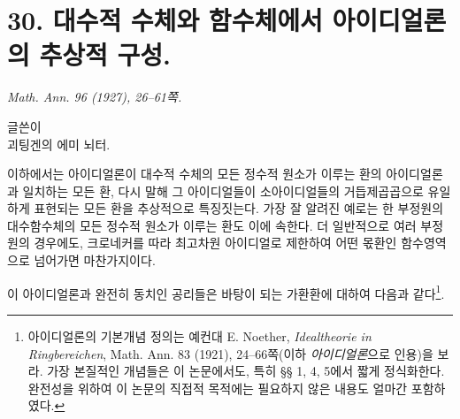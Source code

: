
\providecommand{\mC}{\mathfrak C}
\providecommand{\mE}{\mathfrak E}
\providecommand{\mF}{\mathfrak F}
\providecommand{\mG}{\mathfrak G}
\providecommand{\mH}{\mathfrak H}
\providecommand{\mM}{\mathfrak M}
\providecommand{\mN}{\mathfrak N}
\providecommand{\mO}{\mathfrak O}
\providecommand{\mX}{\mathfrak X}
\providecommand{\mc}{\mathfrak c}
\providecommand{\md}{\mathfrak d}
\providecommand{\me}{\mathfrak e}
\providecommand{\mf}{\mathfrak f}
\providecommand{\mm}{\mathfrak m}
\providecommand{\mn}{\mathfrak n}
\providecommand{\mq}{\mathfrak q}
\providecommand{\mt}{\mathfrak t}
\providecommand{\mv}{\mathfrak v}
\providecommand{\mpideal}{\mathfrak p}

\section*{30. 대수적 수체와 함수체에서 아이디얼론의 추상적 구성.}
\noindent\emph{Math. Ann. 96 (1927), 26--61쪽.}

\setcounter{footnote}{0}

\begin{center}
글쓴이\\[0.5em]
괴팅겐의 에미 뇌터.
\end{center}

이하에서는 아이디얼론이 대수적 수체의 모든 정수적 원소가 이루는 환의 아이디얼론과 일치하는 모든 환, 다시 말해 그 아이디얼들이 소아이디얼들의 거듭제곱곱으로 유일하게 표현되는 모든 환을 추상적으로 특징짓는다. 가장 잘 알려진 예로는 한 부정원의 대수함수체의 모든 정수적 원소가 이루는 환도 이에 속한다. 더 일반적으로 여러 부정원의 경우에도, 크로네커를 따라 최고차원 아이디얼로 제한하여 어떤 몫환인 함수영역으로 넘어가면 마찬가지이다.

이 아이디얼론과 완전히 동치인 공리들은 바탕이 되는 가환환에 대하여 다음과 같다\footnote{아이디얼론의 기본개념 정의는 예컨대 E. Noether, \emph{Idealtheorie in Ringbereichen}, Math. Ann. 83 (1921), 24--66쪽(이하 \emph{아이디얼론}으로 인용)을 보라. 가장 본질적인 개념들은 이 논문에서도, 특히 §§ 1, 4, 5에서 짧게 정식화한다. 완전성을 위하여 이 논문의 직접적 목적에는 필요하지 않은 내용도 얼마간 포함하였다.}.

